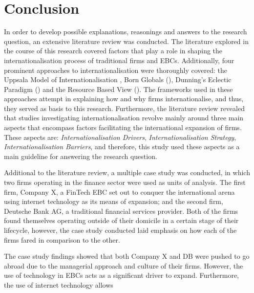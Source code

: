 \documentclass[11pt,a4paper]{article}
\begin{document}
{{{\section{Conclusion}
\label{conclusion}
\vspace{-1mm}
  \par
In order to develop possible explanations, reasonings and answers to the research question, an extensive literature review was conducted. The literature explored in the course of this research covered factors that play a role in shaping the internationalisation process of traditional firms and EBCs. Additionally, four prominent approaches to internationalisation were thoroughly covered: the Uppsala Model of Internationalisation \parencite{johansonInternationalizationProcessFirm1977}, Born Globals (\cite{rennieGlobalCompetitivenessBorn1993}), Dunning's Eclectic Paradigm (\cite{dunningEclecticTheoryInternational1980}) and the Resource Based View (\cite{barneyFirmResourcesSustained1991}). The frameworks used in these approaches attempt in explaining how and why firms internationalise, and thus, they served as basis to this research. Furthermore, the literature review revealed that studies investigating internationalisation revolve mainly around three main aspects that encompass factors facilitating the international expansion of firms. These aspects are: \textit{Internationalisation Drivers}, \textit{Internationalisation Strategy}, \textit{Internationalisation Barriers}, and therefore, this study used these aspects as a main guideline for answering the research question.  \par
Additional to the literature review, a multiple case study was conducted, in which two firms operating in the finance sector were used as units of analysis. The first firm, Company X, a FinTech EBC set out to conquer the international arena using internet technology as its means of expansion; and the second firm, Deutsche Bank AG, a traditional financial services provider. Both of the firms found themselves operating outside of their domicile in a certain stage of their lifecycle, however, the case study conducted laid emphasis on how each of the firms fared in comparison to the other. \par
The case study findings showed that both Company X and DB were pushed to go abroad due to the managerial approach and culture of their firms. However, the use of technology in EBCs acts as a significant driver to expand. Furthermore, the use of internet technology allows \newpage

}}}
\end{document}

